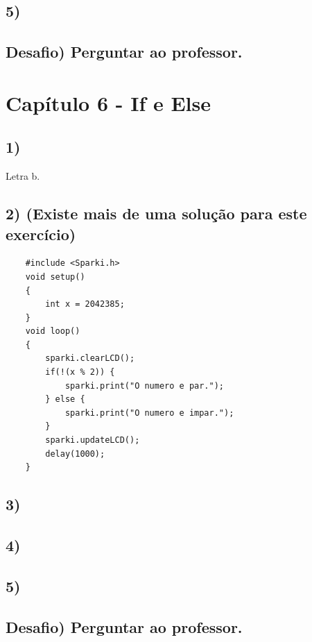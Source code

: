     \subsection*{5)}
    
    \subsection*{Desafio) Perguntar ao professor.}

\section{Capítulo 6 - If e Else}

    \subsection*{1)} Letra b.
    
    \subsection*{2) (Existe mais de uma solução para este exercício)}
    
    \begin{verbatim}
    #include <Sparki.h>
    void setup()
    {
        int x = 2042385;
    }
    void loop()
    {
        sparki.clearLCD();
        if(!(x % 2)) {
            sparki.print("O numero e par.");
        } else {
            sparki.print("O numero e impar.");
        }
        sparki.updateLCD();
        delay(1000);
    }
    \end{verbatim}
    
    \subsection*{3)}
    
    \subsection*{4)}
    
    \subsection*{5)}
    
    \subsection*{Desafio) Perguntar ao professor.}

